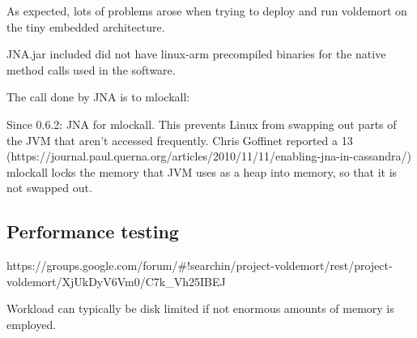 As expected, lots of problems arose when trying to deploy and run voldemort on the tiny embedded architecture.

JNA.jar included did not have linux-arm precompiled binaries for the native method calls used in the software.

The call done by JNA is to mlockall:

Since 0.6.2: JNA for mlockall. This prevents Linux from swapping out parts of the JVM that aren't accessed frequently. Chris Goffinet reported a 13%
(https://journal.paul.querna.org/articles/2010/11/11/enabling-jna-in-cassandra/)
mlockall locks the memory that JVM uses as a heap into memory, so that it is not swapped out.

\subsection{Performance testing}

https://groups.google.com/forum/#!searchin/project-voldemort/rest/project-voldemort/XjUkDyV6Vm0/C7k_Vh25IBEJ

Workload can typically be disk limited if not enormous amounts of memory is employed.


